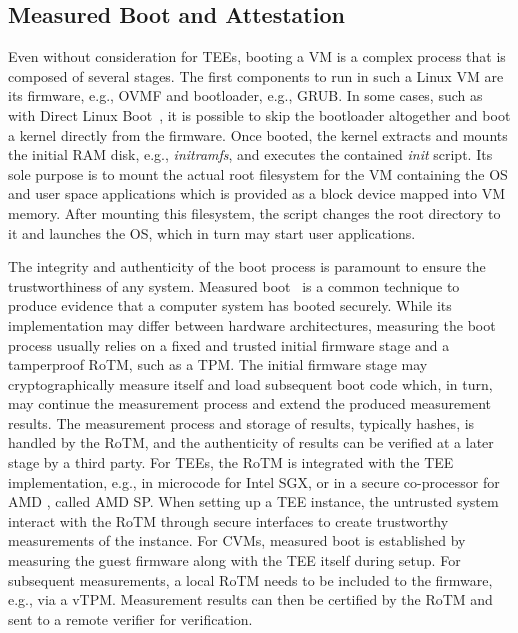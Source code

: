 
\subsection{Measured Boot and Attestation}

Even without consideration for \acp{TEE}, booting a VM is a complex process that
is composed of several stages. The first components to run in such a Linux VM
are its firmware, e.g., \ac{OVMF} and bootloader, e.g., GRUB. In some cases,
such as with Direct Linux Boot~\cite{directLinuxBoot}, it is possible to skip
the bootloader altogether and boot a kernel directly from the firmware. Once
booted, the kernel extracts and mounts the initial RAM disk, e.g.,
\emph{initramfs}, and executes the contained \emph{init} script. Its sole
purpose is to mount the actual root filesystem for the VM containing the OS and
user space applications which is provided as a block device mapped into VM
memory. After mounting this filesystem, the script changes the root directory to
it and launches the OS, which in turn may start user applications.

The integrity and authenticity of the boot process is paramount to ensure the
trustworthiness of any system. Measured boot~\cite{measuredBoot} is a common
technique to produce evidence that a computer system has booted securely. While
its implementation may differ between hardware architectures, measuring the boot
process usually relies on a fixed and trusted initial firmware stage and a
tamperproof \ac{RoTM}, such as a \ac{TPM}. The initial firmware stage may
cryptographically measure itself and load subsequent boot code which, in turn,
may continue the measurement process and extend the produced measurement
results. The measurement process and storage of results, typically hashes, is
handled by the \ac{RoTM}, and the authenticity of results can be verified at a
later stage by a third party. For \acp{TEE}, the \ac{RoTM} is integrated with
the \ac{TEE} implementation, e.g., in microcode for Intel SGX, or in a secure
co-processor for AMD \sevsnp, called AMD \ac{SP}. When setting up a \ac{TEE}
instance, the untrusted system interact with the \ac{RoTM} through secure
interfaces to create trustworthy measurements of the instance. For \acp{CVM},
measured boot is established by measuring the guest firmware along with the
\ac{TEE} itself during setup. For subsequent measurements, a local \ac{RoTM}
needs to be included to the firmware, e.g., via a \ac{vTPM}. Measurement results
can then be certified by the \ac{RoTM} and sent to a remote verifier for
verification.

